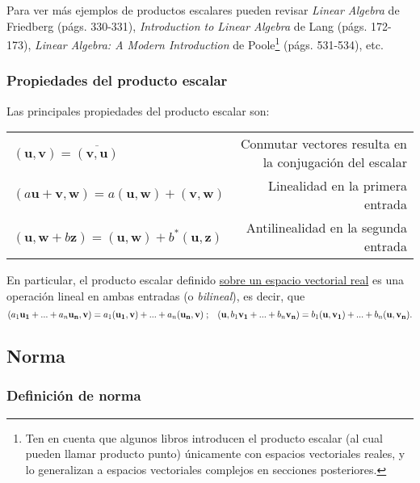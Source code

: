 \documentclass[12pt]{article}
\begin{document}
\vspace{3mm}

Para ver más ejemplos de productos escalares pueden revisar \emph{Linear Algebra} de Friedberg (págs. 330-331), \emph{Introduction to Linear Algebra} de Lang (págs. 172-173), \textit{Linear Algebra: A Modern Introduction} de Poole\footnote{Ten en cuenta que algunos libros introducen el producto escalar (al cual pueden llamar producto punto) únicamente con espacios vectoriales reales, y lo generalizan a espacios vectoriales complejos en secciones posteriores.} (págs. 531-534), etc.


\subsubsection{Propiedades del producto escalar} \label{Prop:Producto_escalar}

Las principales propiedades del producto escalar son:

\begin{center}
    \begin{tabular}{lr}
        $(\mathbf{u},\mathbf{v}) = \overline{(\mathbf{v},\mathbf{u})}$ & Conmutar vectores resulta en la conjugación del escalar \\
        $(a\mathbf{u}+\mathbf{v},\mathbf{w}) = a(\mathbf{u},\mathbf{w}) + (\mathbf{v},\mathbf{w})$ & Linealidad en la primera entrada\\
        $(\mathbf{u},\mathbf{w}+b\mathbf{z}) = (\mathbf{u},\mathbf{w}) + b^*(\mathbf{u},\mathbf{z})$ & Antilinealidad en la segunda entrada\\
    \end{tabular}{}
\end{center}{}

En particular, el producto escalar definido \underline{sobre un espacio vectorial real} es una operación lineal en ambas entradas (o \emph{bilineal}), es decir, que $$(a_1\mathbf{u_1}+...+a_n\mathbf{u_n},\mathbf{v})=a_1(\mathbf{u_1},\mathbf{v})+...+a_n(\mathbf{u_n},\mathbf{v})\hspace{1mm};\hspace{3mm} (\mathbf{u},b_1\mathbf{v_1}+...+b_n\mathbf{v_n})=b_1(\mathbf{u},\mathbf{v_1})+...+b_n(\mathbf{u},\mathbf{v_n}).$$

\subsection{Norma}

\subsubsection{Definición de norma} \label{Def:Norma}
\end{document}
